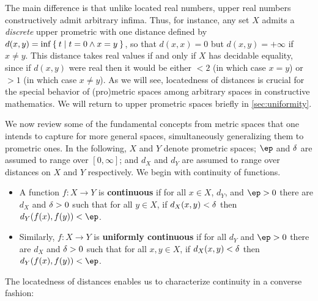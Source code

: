 \documentclass{article}
\def\Rp{[0,\infty]}
\begin{document}
The main difference is that unlike located real numbers, upper real numbers constructively admit arbitrary infima.
Thus, for instance, any set $X$ admits a \emph{discrete} upper prometric with one distance defined by $d(x,y) = \inf \Set{ t | t=0 \land x=y }$, so that $d(x,x)=0$ but $d(x,y)=+\infty$ if $x\neq y$.
This distance takes real values if and only if $X$ has decidable equality, since if $d(x,y)$ were real then it would be either $<2$ (in which case $x=y$) or $>1$ (in which case $x\neq y$).
As we will see, locatedness of distances is crucial for the special behavior of (pro)metric spaces among arbitrary spaces in constructive mathematics.
We will return to upper prometric spaces briefly in \cref{sec:uniformity}.

We now review some of the fundamental concepts from metric spaces that one intends to capture for more general spaces, simultaneously generalizing them to prometric ones.
In the following, $X$ and $Y$ denote prometric spaces; $\ep$ and $\delta$ are assumed to range over $\Rp$; and $d_X$ and $d_Y$ are assumed to range over distances on $X$ and $Y$ respectively.
We begin with continuity of functions.

\begin{itemize}
\item A function $f:X\to Y$ is \textbf{continuous} if for all $x\in X$, $d_Y$, and $\ep>0$ there are $d_X$ and $\delta>0$ such that for all $y\in X$, if $d_X(x,y)<\delta$ then $d_Y(f(x),f(y))<\ep$.
\item Similarly, $f:X\to Y$ is \textbf{uniformly continuous} if for all $d_Y$ and $\ep>0$ there are $d_X$ and $\delta>0$ such that for all $x,y\in X$, if $d_X(x,y)<\delta$ then $d_Y(f(x),f(y))<\ep$.
\end{itemize}

The locatedness of distances enables us to characterize continuity in a converse fashion:
\end{document}
